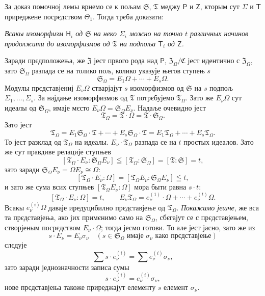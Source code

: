 \documentclass[11pt]{article}
\begin{document}
За доказ помочној лемы врнемо се к пољам \(\mathfrak S\), \(\mathfrak T\) меджу \(\mathsf P\) и \(\mathsf Z\), кторым сут \(\Sigma\) и \(\mathsf T\) приреджене посрєдством \(\Theta_1\). Тогда трєба доказати:

\emph{Всакы изоморфизм \(\mathsf{H}_i\) од \(\mathfrak S\) на неко \(\Sigma_i\) можно на точно \(t\) различных начинов продолжити до изоморфизмов од \(\mathfrak T\) на подпоља \(\mathsf T_i\) од \(\mathsf Z\).}

Заради прєдположења, же \(\mathfrak Z\) јест првого рода над \(\mathsf P\), \(\mathfrak Z_\Omega/\mathfrak C\) јест идентично с \(\mathfrak Z_\Omega\), зато \(\mathfrak S_\Omega\) разпада се на толико пољ, колико указује његов ступењ \(s\)
\[
\mathfrak S_\Omega = E_1\Omega+\cdots+E_s\Omega .
\]
Модулы прєдставјениј \(E_\nu\Omega\) стварјајут \(s\) изоморфизмов од \(\mathfrak S\) на \(s\) подпољ \(\Sigma_1,\ldots,\Sigma_s\). За најдање изоморфизмов од \(\mathfrak T\) потрєбујемо \(\mathfrak T_\Omega\). Зато же \(E_\nu\Omega\) сут идеалы од \(\mathfrak S_\Omega\), имаје мєсто \(E_\nu\Omega=\mathfrak S_\Omega E_\nu\). Надаље очевидно јест
\[
\mathfrak T_\Omega=\mathfrak T\cdot\Omega=\mathfrak T\cdot\mathfrak S_\Omega .
\]
Зато јест
\[
\mathfrak T_\Omega
=E_1\mathfrak S_\Omega\cdot\mathfrak T+\cdots+E_s\mathfrak S_\Omega\cdot\mathfrak T
=E_1\mathfrak T_\Omega+\cdots+E_s\mathfrak T_\Omega .
\]
То јест разклад од \(\mathfrak T_\Omega\) на идеалы. \(E_\nu\cdot\mathfrak T_\Omega\) разпада се на \(t\) простых идеалов. Зато же сут правдиве релације ступњев
\[
[\mathfrak T_\Omega\cdot E_\nu:\mathfrak S_\Omega E_\nu]
\leqq [\mathfrak T_\Omega:\mathfrak S_\Omega]=[\mathfrak T:\mathfrak S]=t,
\]
зато заради \(\mathfrak S_\Omega E_\nu=\Omega E_\nu\cong\Omega\):
\[
[\mathfrak T_\Omega\cdot E_\nu:\Omega]
=[\mathfrak T_\Omega E_\nu:\mathfrak S_\Omega E_\nu]\leqq t,
\]
и зато же сума всих ступњев \([\mathfrak T_\Omega E_\nu:\Omega]\) мора быти равна \(s\cdot t\):
\[
[\mathfrak T_\Omega\cdot E_\nu:\Omega]=t,\qquad
E_\nu\mathfrak T_\Omega=e_\nu^{(1)}\cdot\Omega+\cdots+e_\nu^{(t)}\Omega .
\]
Всакы \(e_\nu^{(i)}\Omega\) даваје иредуцибилно прєдставјење од \(\mathfrak T_\Omega\). \emph{Покажимо јешче}, же вса та прєдставјења, ако јих примєнимо само на \(\mathfrak S_\Omega\), сбєгајут се с прєдставјењем, створјеным посрєдством \(E_\nu\cdot\Omega\); тогда јесмо готови. То але јест јасно, зато же из
\[
s\cdot E_\nu=E_\nu\sigma_\nu\quad
(s\in\mathfrak S_\Omega\text{ имаје }\sigma_\nu\text{ како прєдставјење})
\]
слєдује
\[
\sum s\cdot e_\nu^{(i)}=\sum e_\nu^{(i)}\sigma_\nu,
\]
зато заради једнозначности записа сумы
\[
s\cdot e_\nu^{(i)}=e_\nu^{(i)}\sigma_\nu,
\]
нове прєдставјења такоже приреджајут елементу \(s\) елемент \(\sigma_\nu\).
\end{document}
